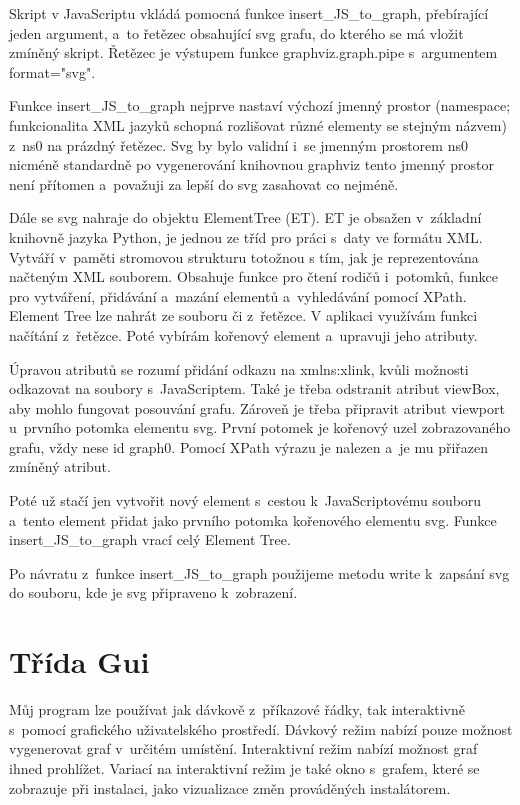\documentclass[color,table,oneside,nolot,nolof]{fithesis}
\begin{document}
	Skript v JavaScriptu vkládá pomocná funkce insert\_JS\_to\_graph, přebírající jeden argument, a~to řetězec obsahující svg grafu, do kterého se má vložit zmíněný skript. Řetězec je výstupem funkce
	graphviz.graph.pipe s~argumentem format="svg". 

	Funkce insert\_JS\_to\_graph nejprve nastaví výchozí jmenný prostor (namespace; funkcionalita XML jazyků schopná rozlišovat různé elementy se stejným názvem) z~ns0 na prázdný 
	řetězec. Svg by bylo validní i~se jmenným prostorem ns0 nicméně standardně po vygenerování knihovnou graphviz tento jmenný prostor není přítomen a~považuji za lepší do svg 
	zasahovat co nejméně. 

	Dále se svg nahraje do objektu ElementTree (ET). ET je obsažen v~základní knihovně jazyka Python, je jednou ze tříd pro práci s~daty ve formátu XML. Vytváří v~paměti stromovou
	strukturu totožnou s tím, jak je reprezentována načteným XML souborem. Obsahuje funkce pro čtení rodičů i~potomků, funkce pro vytváření, přidávání a~mazání elementů a~vyhledávání pomocí 
	XPath. Element Tree lze nahrát ze souboru či z~řetězce. V aplikaci využívám funkci načítání z~řetězce. Poté vybírám kořenový element a~upravuji jeho atributy.

	Úpravou atributů se rozumí přidání odkazu na xmlns:xlink, kvůli možnosti odkazovat na soubory s~JavaScriptem. Také je třeba odstranit atribut viewBox, aby mohlo fungovat posouvání
	grafu. Zároveň je třeba připravit atribut viewport u~prvního potomka elementu svg. První potomek je kořenový uzel zobrazovaného grafu, vždy nese id graph0. Pomocí XPath výrazu je
	nalezen a~je mu  přiřazen zmíněný atribut.

	Poté už stačí jen vytvořit nový element s~cestou k~JavaScriptovému souboru a~tento element přidat jako prvního potomka kořenového elementu svg. Funkce insert\_JS\_to\_graph vrací celý
	Element Tree.

	Po návratu z~funkce insert\_JS\_to\_graph použijeme metodu write k~zapsání svg do souboru, kde je svg připraveno k~zobrazení.

\section{Třída Gui}
	Můj program lze používat jak dávkově z~příkazové řádky, tak interaktivně s~pomocí grafického uživatelského prostředí. Dávkový režim nabízí pouze možnost vygenerovat graf v~určitém 
	umístění. Interaktivní režim nabízí možnost graf ihned prohlížet. Variací na interaktivní režim je také okno s~grafem, které se zobrazuje při instalaci, jako vizualizace změn prováděných
	instalátorem. 
\end{document}
